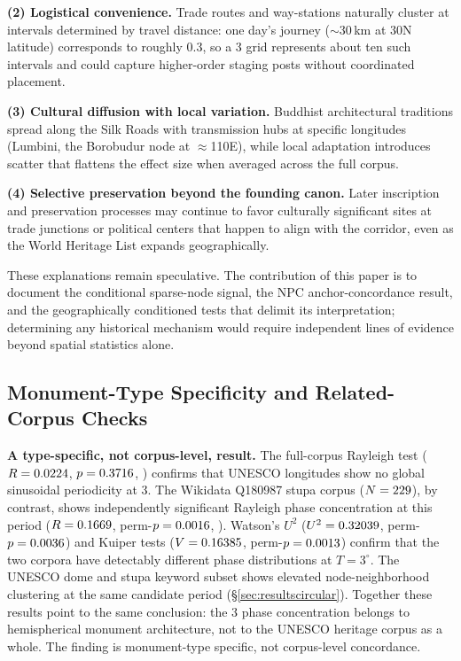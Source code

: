\textbf{(2) Logistical convenience.} Trade routes and way-stations
naturally cluster at intervals determined by travel distance: one
day's journey ($\sim$30\,km at 30\textdegree{}N latitude) corresponds
to roughly $0.3$\textdegree{}, so a 3\textdegree{} grid represents
about ten such intervals and could capture higher-order staging posts
without coordinated placement.

\textbf{(3) Cultural diffusion with local variation.} Buddhist
architectural traditions spread along the Silk Roads with transmission
hubs at specific longitudes (Lumbini, the Borobudur node at
$\approx$110\textdegree{}E), while local adaptation introduces scatter
that flattens the effect size when averaged across the full corpus.

\textbf{(4) Selective preservation beyond the founding canon.} Later
inscription and preservation processes may continue to favor
culturally significant sites at trade junctions or political centers
that happen to align with the corridor, even as the World Heritage
List expands geographically.

These explanations remain speculative. The contribution of this paper
is to document the conditional sparse-node signal, the NPC
anchor-concordance result, and the geographically conditioned tests that
delimit its interpretation; determining any historical mechanism would
require independent lines of evidence beyond spatial statistics alone.

\subsection{Monument-Type Specificity and Related-Corpus Checks}
\label{sec:transmission}

\textbf{A type-specific, not corpus-level, result.}
The full-corpus Rayleigh test ($R = 0.0224$,
$p = 0.3716$, \fullRayleighPermPSig{}) confirms that UNESCO
longitudes show no global sinusoidal periodicity at 3\textdegree{}.
The Wikidata Q180987 stupa corpus ($N=229{}$), by contrast,
shows independently significant Rayleigh phase concentration at this
period ($R=0.1669{}$, perm-$p=0.0016{}$,
\circConcStupaPSig{}). Watson's $U^2$ ($U^2=0.32039{}$,
perm-$p=0.0036{}$) and Kuiper tests
($V=0.16385{}$, perm-$p=0.0013{}$)
confirm that the two corpora have detectably different phase
distributions at $T=3^\circ$. The UNESCO dome and stupa keyword
subset shows elevated node-neighborhood clustering at the same
candidate period (\S\ref{sec:resultscircular}). Together these results
point to the same conclusion: the 3\textdegree{} phase concentration
belongs to hemispherical monument architecture, not to the UNESCO
heritage corpus as a whole. The finding is monument-type specific,
not corpus-level concordance.

